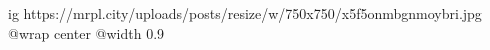  
 
 
 
 

\ifcmt
  ig https://mrpl.city/uploads/posts/resize/w/750x750/x5f5onmbgnmoybri.jpg
  @wrap center
  @width 0.9
\fi
